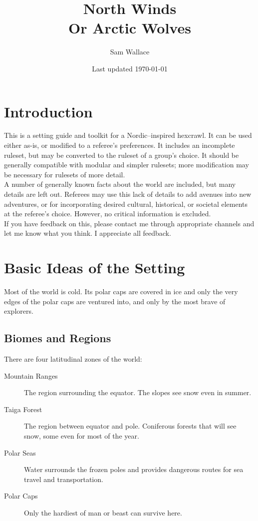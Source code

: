 \documentclass{article}
\title{North Winds \\
  \large Or Arctic Wolves}
\author{Sam Wallace}
\date{Last updated \today}
\begin{document}
\maketitle
\newpage
\tableofcontents

\newpage

\begin{multicols}{2}
  
\section{Introduction}

This is a setting guide and toolkit for a Nordic--inspired hexcrawl.
It can be used either as-is, or modified to a referee's preferences.
It includes an incomplete ruleset, but may be converted to the ruleset of a group's choice.
It should be generally compatible with modular and simpler rulesets; more modification may be necessary for rulesets of more detail. \\

A number of generally known facts about the world are included, but many details are left out.
Referees may use this lack of details to add avenues into new adventures, or for incorporating desired cultural, historical, or societal elements at the referee's choice.
However, no critical information is excluded. \\

If you have feedback on this, please contact me through appropriate channels and let me know what you think.
I appreciate all feedback.


\section{Basic Ideas of the Setting}

Most of the world is cold. Its polar caps are covered in ice and only the very edges of the polar caps are ventured into, and only by the most brave of explorers.

\subsection{Biomes and Regions}

There are four latitudinal zones of the world:

\begin{description}
\item[Mountain Ranges] The region surrounding the equator. The slopes see snow even in summer.
\item[Taiga Forest] The region between equator and pole. Coniferous forests that will see snow, some even for most of the year.
\item[Polar Seas] Water surrounds the frozen poles and provides dangerous routes for sea travel and transportation.
\item[Polar Caps] Only the hardiest of man or beast can survive here.
\end{description}


\end{multicols}
\end{document}
